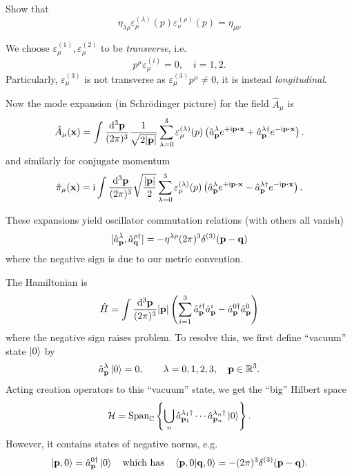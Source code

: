 \documentclass[a4paper,11pt]{article}
\begin{document}
	\begin{exer}
		Show that 
		\[
			\eta _{\lambda \rho} \varepsilon ^{(\lambda)}_\mu (p) \varepsilon ^{(\rho)} _\nu (p)  = \eta _{\mu \nu}
		\]
	\end{exer}

	We choose $\varepsilon ^{(1)}_\mu, \varepsilon ^{(2)}_\mu$ to be \emph{transverse}, i.e.
	\[
		p^\mu \varepsilon ^{(i)}_\mu = 0, \quad i = 1,2.
	\]
	Particularly, $\varepsilon ^{(3)}_\mu$ is not transverse as $\varepsilon ^{(3)}_\mu p^\mu \neq 0$, it is instead \emph{longitudinal}.

	Now the mode expansion (in Schr\"odinger picture) for the field $\hat A_\mu$ is
	\begin{equation*}
		\hat A_\mu (\vb x) = \int \ddk{\vb p}{3} \frac{1}{\sqrt{2 \abs{\vb p}}} \sum _{\lambda = 0}^3 \varepsilon ^{(\lambda)}_\mu(p) \left( \hat a _{\vb p}^\lambda e ^{+ \mathrm{i} \vb p \vdot \vb x} + \hat a^{\lambda\dagger}_{\vb p} e ^{- \mathrm{i} \vb p \vdot \vb x} \right).
	\end{equation*}
	and similarly for conjugate momentum
	\[
		\hat \pi_\mu(\vb x) = \mathrm{i} \int \ddk{\vb p}{3} \sqrt{\frac{\abs{\vb p}}{2}} \sum_{\lambda = 0}^3 \varepsilon ^{(\lambda)}_\mu(p) \left( \hat a ^{\lambda}_{\vb p} e ^{+ \mathrm{i} \vb p \vdot \vb x} - \hat a^{\lambda\dagger}_{\vb p} e ^{-\mathrm{i} \vb p \vdot \vb x} \right).
	\]
	
	These expansions yield oscillator commutation relations (with others all vanish)
	\[
		[\hat a ^{\lambda}_{\vb p}, \hat a ^{\rho\dagger}_{\vb q}] = - \eta ^{\lambda \rho} (2 \pi)^3 \delta ^{(3)}(\vb p - \vb q)
	\]
	where the negative sign is due to our metric convention.

	The Hamiltonian is 
	\[
		\hat H = \int \frac{\dd[3]{\vb p}}{(2\pi)^{3}} \abs{\vb p} \left( \sum _{i = 1}^3 \hat a ^{i\dagger}_{\vb p} \hat a^i _{\vb p} - \hat a ^{0 \dagger}_{\vb p} \hat a^0 _{\vb p} \right)
	\]
	where the negative sign raises problem. To resolve this, we first define ``vacuum'' state $\ket{0}$ by 
	\[
		\hat a ^{\lambda}_{\vb p} \ket{0} = 0, \qquad \lambda = 0,1,2,3, \quad \vb p \in \mathbb{R}^3.
	\]
	Acting creation operators to this ``vacuum'' state, we get the ``big'' Hilbert space 
	\[
		\mathcal{H} = \operatorname{Span} _{\mathbb{C}}\left\{ \bigcup_n \hat a^{\lambda_1\dagger}_{\vb p_1} \cdots \hat a^{\lambda_n\dagger} _{\vb p_n} \ket{0}\right\}.
	\]
	However, it contains states of negative norms, e.g. 
	\[
		\ket{\vb p, 0} = \hat a^{0\dagger} _{\vb p}\ket{0} \quad \text{which has} \quad \braket{\vb p, 0}{\vb q, 0} = - (2 \pi)^3 \delta ^{(3)}(\vb p - \vb q).
	\]
	
\end{document}
